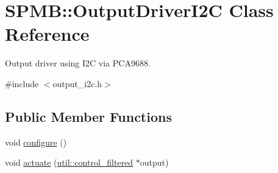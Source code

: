 \hypertarget{classSPMB_1_1OutputDriverI2C}{}\section{S\+P\+MB\+:\+:Output\+Driver\+I2C Class Reference}
\label{classSPMB_1_1OutputDriverI2C}


Output driver using I2C via P\+C\+A9688.  




{\ttfamily \#include $<$output\+\_\+i2c.\+h$>$}

\subsection*{Public Member Functions}
\begin{DoxyCompactItemize}
\item 
void \hyperlink{classSPMB_1_1OutputDriverI2C_a65b12f0a0b98851d21ad863fd1584725}{configure} ()
\item 
void \hyperlink{classSPMB_1_1OutputDriverI2C_a8b82addf2f9101b22cf8bfca160132cb}{actuate} (\hyperlink{structSPMB_1_1util_1_1control__filtered}{util\+::control\+\_\+filtered} $\ast$output)
\end{DoxyCompactItemize}
